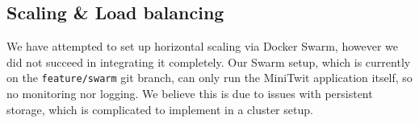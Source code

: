 \subsection{Scaling \& Load balancing}
We have attempted to set up horizontal scaling via Docker Swarm, however we did not succeed in integrating it completely. Our Swarm setup, which is currently on the \texttt{feature/swarm} git branch, can only run the MiniTwit application itself, so no monitoring nor logging. We believe this is due to issues with persistent storage, which is complicated to implement in a cluster setup.